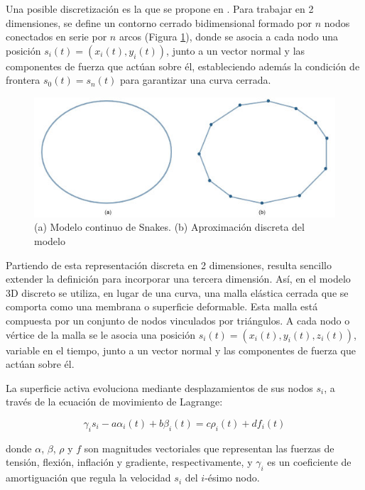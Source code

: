 Una posible discretización es la que se propone en \citep{mcinerney2000t}. Para trabajar en 2 dimensiones, se define un contorno cerrado bidimensional formado por $n$ nodos conectados en serie por $n$ arcos (Figura \ref{fig:modelo_continuo_snakes}), donde se asocia a cada nodo una posición $s_{i}(t) = (x_{i}(t),y_{i}(t))$, junto a un vector normal y las componentes de fuerza que actúan sobre él, estableciendo además la condición de frontera $s_{0}(t)=s_{n}(t)$ para garantizar una curva cerrada.

\begin{figure}[H]
	\centering
	\includegraphics[scale=0.6]{images/ovalo_continuo_vs_discreto.jpg}
	\caption{(a) Modelo continuo de Snakes. (b) Aproximación discreta del modelo}
	\label{fig:modelo_continuo_snakes}
\end{figure}

Partiendo de esta representación discreta en 2 dimensiones, resulta sencillo extender la definición para incorporar una tercera dimensión. Así, en el modelo 3D discreto se utiliza, en lugar de una curva, una malla elástica cerrada que se comporta como una membrana o superficie deformable. Esta malla está compuesta por un conjunto de nodos vinculados por triángulos. A cada nodo o vértice de la malla se le asocia una posición $s_{i}(t)=(x_{i}(t),y_{i}(t), z_{i}(t))$, variable en el tiempo, junto a un vector normal y las componentes de fuerza que actúan sobre él.

La superficie activa evoluciona mediante desplazamientos de sus nodos $s_{i}$, a través de la ecuación de movimiento de Lagrange:

$$ \gamma_{i}s_{i} - a\alpha_{i}(t) + b\beta_{i}(t) = c\rho_{i}(t) + df_{i}(t)  $$

donde $\alpha$, $\beta$, $\rho$  y $f$ son magnitudes vectoriales que representan las fuerzas de tensión, flexión, inflación y gradiente, respectivamente, y $\gamma_{i}$ es un coeficiente de amortiguación que regula la velocidad $s_{i}$ del $i$-ésimo nodo.

